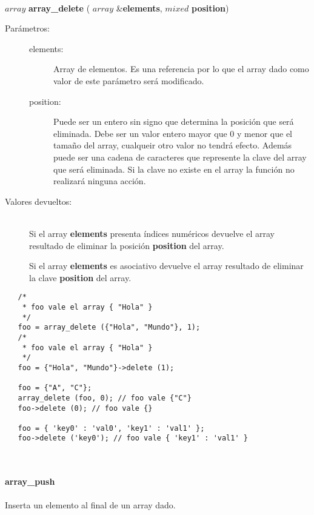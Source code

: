 \hfill \\ $array$ \textbf{array\_delete} ( $array$ \&\textbf{elements}, $mixed$ \textbf{position})  
\begin{description}
\item [Parámetros:] \hfill 
   \begin{description}
   \item[elements:] Array de elementos. Es una referencia por lo que el array dado como valor de este parámetro será modificado. 
   \item[position:] Puede ser un entero sin signo que determina la posición que será eliminada. Debe ser un valor entero mayor que $0$ y
   menor que el tamaño del array, cualqueir otro valor no tendrá efecto. Además puede ser una cadena de caracteres que 
   represente la clave del array que será eliminada. Si la clave no existe en el array la función no realizará ninguna acción.
   \end{description}
\item[Valores devueltos:] \hfill \\
   Si el array \textbf{elements} presenta índices numéricos devuelve el array resultado de eliminar la posición \textbf{position} del array. 
   
   Si el array \textbf{elements} es asociativo devuelve el array resultado de eliminar la clave \textbf{position} del array. 
\end{description}
     
\begin{lstlisting}   
   /*
    * foo vale el array { "Hola" }
    */
   foo = array_delete ({"Hola", "Mundo"}, 1); 
   /*
    * foo vale el array { "Hola" }
    */
   foo = {"Hola", "Mundo"}->delete (1);
   
   foo = {"A", "C"};
   array_delete (foo, 0); // foo vale {"C"}
   foo->delete (0); // foo vale {}
   
   foo = { 'key0' : 'val0', 'key1' : 'val1' };
   foo->delete ('key0'); // foo vale { 'key1' : 'val1' }
\end{lstlisting}
\hfill\\ 

\paragraph{array\_push}
Inserta un elemento al final de un array dado.

